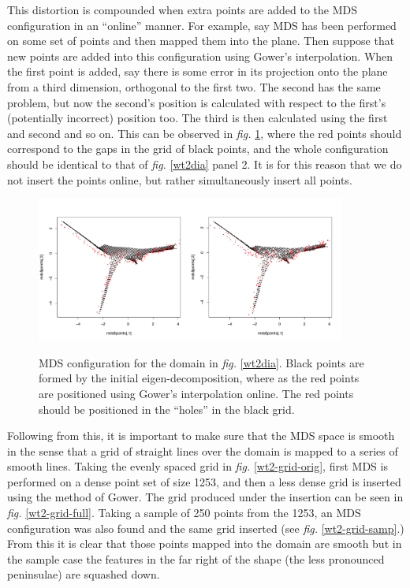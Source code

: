 \documentclass[a4paper,10pt]{article}
\newcommand{\fig}[1]{\emph{fig.} \ref{#1}}
\begin{document}
This distortion is compounded when extra points are added to the MDS configuration in an ``online'' manner. For example, say MDS has been performed on some set of points and then mapped them into the plane. Then suppose that new points are added into this configuration using Gower's interpolation. When the first point is added, say there is some error in its projection onto the plane from a third dimension, orthogonal to the first two. The second has the same problem, but now the second's position is calculated with respect to the first's (potentially incorrect) position too. The third is then calculated using the first and second and so on. This can be observed in \fig{gowererror}, where the red points should correspond to the gaps in the grid of black points, and the whole configuration should be identical to that of \fig{wt2dia} panel 2. It is for this reason that we do not insert the points online, but rather simultaneously insert all points.

\begin{figure}
\centering
\includegraphics[width=4in]{figs/gowererror.pdf} \\
\caption{MDS configuration for the domain in \fig{wt2dia}. Black points are formed by the initial eigen-decomposition, where as the red points are positioned using Gower's interpolation online. The red points should be positioned in the ``holes'' in the black grid.}
\label{gowererror}
\end{figure}


Following from this, it is important to make sure that the MDS space is smooth in the sense that a grid of straight lines over the domain is mapped to a series of smooth lines. Taking the evenly spaced grid in \fig{wt2-grid-orig}, first MDS is performed on a dense point set of size 1253, and then a less dense grid is inserted using the method of Gower. The grid produced under the insertion can be seen in \fig{wt2-grid-full}. Taking a sample of 250 points from the 1253, an MDS configuration was also found and the same grid inserted (see \fig{wt2-grid-samp}.) From this it is clear that those points mapped into the domain are smooth but in the sample case the features in the far right of the shape (the less pronounced peninsulae) are squashed down.
\end{document}
